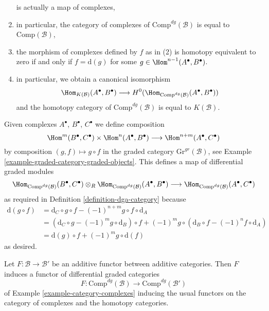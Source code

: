 \begin{example}
\begin{enumerate}
is actually a map of complexes,
\item in particular, the category of complexes of
$\text{Comp}^{dg}(\mathcal{B})$ is equal to $\text{Comp}(\mathcal{B})$,
\item the morphism of complexes defined by $f$ as in (2)
is homotopy equivalent to zero if and only if $f = \text{d}(g)$
for some $g \in \Hom^{n - 1}(A^\bullet, B^\bullet)$.
\item in particular, we obtain a canonical isomorphism
$$
\Hom_{K(\mathcal{B})}(A^\bullet, B^\bullet)
\longrightarrow
H^0(\Hom_{\text{Comp}^{dg}(\mathcal{B})}(A^\bullet, B^\bullet))
$$
and the homotopy category of $\text{Comp}^{dg}(\mathcal{B})$ is equal to
$K(\mathcal{B})$.
\end{enumerate}
Given complexes $A^\bullet$, $B^\bullet$, $C^\bullet$ we define
composition
$$
\Hom^m(B^\bullet, C^\bullet) \times \Hom^n(A^\bullet, B^\bullet)
\longrightarrow
\Hom^{n + m}(A^\bullet, C^\bullet)
$$
by composition $(g, f) \mapsto g \circ f$ in the graded category
$\text{Gr}^{gr}(\mathcal{B})$, see
Example \ref{example-graded-category-graded-objects}.
This defines a map of differential graded modules
$$
\Hom_{\text{Comp}^{dg}(\mathcal{B})}(B^\bullet, C^\bullet)
\otimes_R
\Hom_{\text{Comp}^{dg}(\mathcal{B})}(A^\bullet, B^\bullet)
\longrightarrow
\Hom_{\text{Comp}^{dg}(\mathcal{B})}(A^\bullet, C^\bullet)
$$
as required in Definition \ref{definition-dga-category}
because
\begin{align*}
\text{d}(g \circ f) & =
\text{d}_C \circ g \circ f - (-1)^{n + m} g \circ f \circ \text{d}_A \\
& =
\left(\text{d}_C \circ g - (-1)^m g \circ \text{d}_B\right) \circ f +
(-1)^m g \circ \left(\text{d}_B \circ f - (-1)^n f \circ \text{d}_A\right) \\
& =
\text{d}(g) \circ f + (-1)^m g \circ \text{d}(f)
\end{align*}
as desired.
\end{example}

\begin{lemma}
\label{lemma-additive-functor-induces-dga-functor}
Let $F : \mathcal{B} \to \mathcal{B}'$ be an additive functor between
additive categories. Then $F$ induces a functor of differential
graded categories
$$
F : \text{Comp}^{dg}(\mathcal{B}) \to \text{Comp}^{dg}(\mathcal{B}')
$$
of Example \ref{example-category-complexes}
inducing the usual functors on the category of complexes and the
homotopy categories.
\end{lemma}

